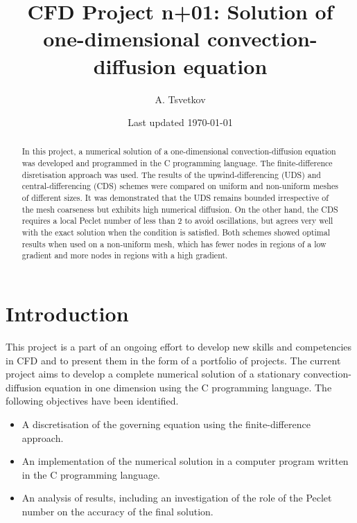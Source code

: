 \documentclass[12pt]{article}
\title{CFD Project n+01: Solution of one-dimensional convection-diffusion equation}
\author{A. Tsvetkov}
\date{Last updated \today}
\begin{document}
\begin{titlepage}

\maketitle{}

\begin{abstract}
In this project, a numerical solution of a one-dimensional convection-diffusion equation was developed and programmed in the C programming language. The finite-difference disretisation approach was used. The results of the upwind-differencing (UDS) and central-differencing (CDS) schemes were compared on uniform and non-uniform meshes of different sizes. It was demonstrated that the UDS remains bounded irrespective of the mesh coarseness but exhibits high numerical diffusion. On the other hand, the CDS requires a local Peclet number of less than 2 to avoid oscillations, but agrees very well with the exact solution when the condition is satisfied. Both schemes showed optimal results when used on a non-uniform mesh, which has fewer nodes in regions of a low gradient and more nodes in regions with a high gradient.
\end{abstract}

\thispagestyle{empty}

\end{titlepage}


\newpage
{}
\tableofcontents


\newpage
{}
\section{Introduction}
\label{sec:intro}

This project is a part of an ongoing effort to develop new skills and competencies in CFD and to present them in the form of a portfolio of projects. The current project aims to develop a complete numerical solution of a stationary convection-diffusion equation in one dimension using the C programming language. The following objectives have been identified.

\begin{itemize}
\item A discretisation of the governing equation using the finite-difference approach.
\item An implementation of the numerical solution in a computer program written in the C programming language.
\item An analysis of results, including an investigation of the role of the Peclet number on the accuracy of the final solution.
\end{itemize}
\end{document}
